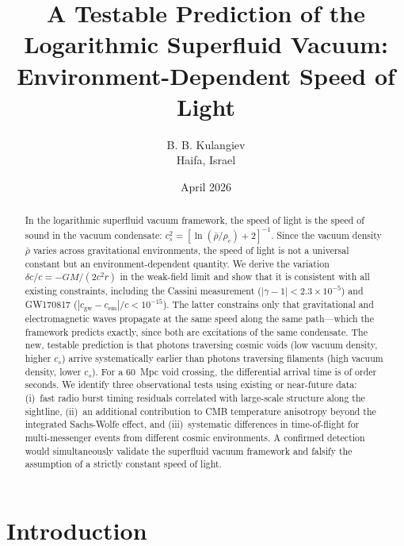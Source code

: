 \documentclass[12pt, a4paper]{article}
\newcommand{\rhob}{\bar{\rho}}
\begin{document}
\title{A Testable Prediction of the Logarithmic Superfluid Vacuum: Environment-Dependent Speed of Light}

\author{B. B. Kulangiev\\\small{Haifa, Israel}}
\date{April 2026}
\maketitle

\begin{abstract}
\noindent
In the logarithmic superfluid vacuum framework, the
speed of light is the speed of sound in the vacuum
condensate: $c_s^2 = [\ln(\rhob/\rho_c) + 2]^{-1}$.
Since the vacuum density $\rhob$ varies across
gravitational environments, the speed of light is not
a universal constant but an environment-dependent
quantity. We derive the variation
$\delta c/c = -GM/(2c^2 r)$ in the weak-field limit
and show that it is consistent with all existing
constraints, including the Cassini measurement
($|\gamma - 1| < 2.3 \times 10^{-5}$) and GW170817
($|c_{\mathrm{gw}} - c_{\mathrm{em}}|/c < 10^{-15}$).
The latter constrains only that gravitational and
electromagnetic waves propagate at the same speed
along the same path---which the framework predicts
exactly, since both are excitations of the same
condensate. The new, testable prediction is that
photons traversing cosmic voids (low vacuum density,
higher $c_s$) arrive systematically earlier than
photons traversing filaments (high vacuum density,
lower $c_s$). For a 60~Mpc void crossing, the
differential arrival time is of order seconds.
We identify three observational tests using existing
or near-future data: (i)~fast radio burst timing
residuals correlated with large-scale structure along
the sightline, (ii)~an additional contribution to CMB
temperature anisotropy beyond the integrated
Sachs-Wolfe effect, and (iii)~systematic differences
in time-of-flight for multi-messenger events from
different cosmic environments. A confirmed detection
would simultaneously validate the superfluid vacuum
framework and falsify the assumption of a strictly
constant speed of light.
\end{abstract}


\section{Introduction}
\label{sec:intro}
\end{document}
